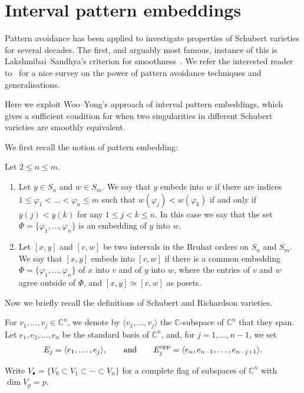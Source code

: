 \documentclass[pdftex]{sigma}
\numberwithin{equation}{section}
\newcommand{\C}{\mathbb{C}}
\begin{document}
\section{Interval pattern embeddings}
Pattern avoidance has been applied to investigate properties of Schubert varieties for several decades. The first, and arguably most famous, instance of this is Lakshmibai--Sandhya's criterion for smoothness~\cite{lakshmibaisandhya}. We refer the interested reader to~\cite{patternavoidance} for a nice survey on the power of pattern avoidance techniques and generalisations.

Here we exploit Woo--Yong's approach of interval pattern embeddings, which gives a sufficient condition for when two singularities in different Schubert varieties are smoothly equivalent.

We first recall the notion of pattern embedding:

\begin{Definition}\label{defn_patternavoiding} Let $2\leq n\leq m$.
\begin{enumerate}\itemsep=0pt
\item Let $y\in S_n$ and $w\in S_m$. We say that $y$ embeds into $w$ if there are indices $1\leq \varphi_1< \dots< \varphi_n\leq m$ such that $w(\varphi_j)<w(\varphi_{k})$ if and only if $y(j)<y(k)$ for any $1\leq j< k\leq n$. In this case we say that the set $\Phi=\{\varphi_1, \dots, \varphi_n\}$ is an embedding of $y$ into $w$.
\item Let $[x,y]$ and $[v,w]$ be two intervals in the Bruhat orders on $S_n$ and $S_m$. We say that $[x,y]$ embeds into $[v,w]$ if there is a common embedding $\Phi=\{\varphi_1, \dots, \varphi_n\}$ of $x$ into $v$ and of $y$ into $w$, where the entries of $v$ and $w$ agree outside of $\Phi$, and $[x,y]\simeq [v,w]$ as posets.
\end{enumerate}
\end{Definition}


Now we briefly recall the definitions of Schubert and Richardson varieties.

For $v_1, \dots, v_j\in \mathbb{C}^n$, we denote by $\langle v_1, \dots, v_j\rangle$ the $\mathbb{C}$-subspace of $\mathbb{C}^n$ that they span.
 Let $e_1, e_2, \dots, e_n$ be the standard basis of $\mathbb{C}^n$, and, for $j=1, \dots, n-1$, we set
\[
E_j=\langle e_1,\dots, e_j\rangle,\qquad\hbox{and}\qquad E^{\textrm{opp}}_j=\langle e_n, e_{n-1}, \dots, e_{n-j+1}\rangle.
\]

Write $V_\bullet=\{V_0\subset V_1\subset\cdots \subset V_n\}$ for a complete flag of subspaces of $\C^n$ with $\dim V_p=p$.
\end{document}
